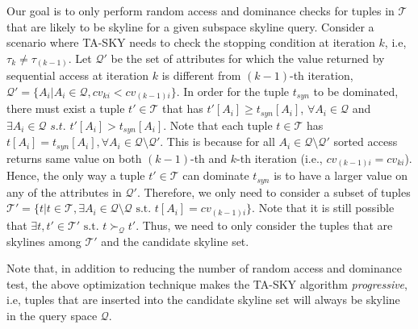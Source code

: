 \vspace{1mm}
 Our goal is to only perform random access and dominance checks for tuples in $\mathcal{T}$ that are likely to be skyline for a given subspace skyline query. Consider a scenario where TA-SKY needs to check the stopping condition at iteration $k$, i.e, $\tau_k \neq \tau_{(k-1)}$. Let $\mathcal{Q'}$ be the set of attributes for which the value returned by sequential access at iteration $k$ is different from $(k-1)$-th iteration, $\mathcal{Q'} = \{A_i | A_i \in \mathcal{Q}, cv_{ki} < cv_{(k-1)i} \}$. In order for the tuple $t_{syn}$ to be dominated, there must exist a tuple $t' \in \mathcal{T}$ that has $t'[A_i] \geq t_{syn}[A_i]$, $\forall A_i \in \mathcal{Q}$ and $\exists A_i \in \mathcal{Q}$ $s.t.$ $t'[A_i] > t_{syn}[A_i]$. Note that each tuple $t \in \mathcal{T}$ has $t[A_i] = t_{syn}[A_i], \forall A_i \in \mathcal{Q} \setminus \mathcal{Q'}$. This is because for all $A_i \in \mathcal{Q} \setminus \mathcal{Q'}$ sorted access returns same value on both $(k-1)$-th and $k$-th iteration (i.e., $cv_{(k-1)i} = cv_{ki}$). Hence, the only way a tuple $t' \in \mathcal{T}$ can dominate $t_{syn}$ is to have a larger value on any of the attributes in $\mathcal{Q'}$. Therefore, we only need to consider a subset of tuples $\mathcal{T'} = \{ t | t \in \mathcal{T}, \exists A_i \in \mathcal{Q} \setminus \mathcal{Q} \text{ s.t. } t[A_i] = cv_{(k-1)i} \}$. Note that it is still possible that $\exists t, t' \in \mathcal{T'} \text{ s.t. } t \succ_{\mathcal{Q}} t'$. Thus, we need to only consider the tuples that are skylines among $\mathcal{T'}$ and the candidate skyline set. 

Note that, in addition to reducing the number of random access and dominance test, the above optimization technique makes the TA-SKY algorithm {\em progressive}, i.e, tuples that are inserted into the candidate skyline set will always be skyline in the query space $\mathcal{Q}$.


